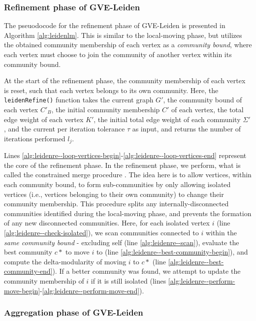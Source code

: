 \subsubsection{Refinement phase of GVE-Leiden}

The pseuodocode for the refinement phase of GVE-Leiden is presented in Algorithm \ref{alg:leidenlm}. This is similar to the local-moving phase, but utilizes the obtained community membership of each vertex as a \textit{community bound}, where each vertex must choose to join the community of another vertex within its community bound. At the start of the refinement phase, the community membership of each vertex is reset, such that each vertex belongs to its own community. Here, the \texttt{leidenRefine()} function takes the current graph $G'$, the community bound of each vertex $C'_B$, the initial community membership $C'$ of each vertex, the total edge weight of each vertex $K'$, the initial total edge weight of each community $\Sigma'$, and the current per iteration tolerance $\tau$ as input, and returns the number of iterations performed $l_j$.

Lines \ref{alg:leidenre--loop-vertices-begin}-\ref{alg:leidenre--loop-vertices-end} represent the core of the refinement phase. In the refinement phase, we perform, what is called the constrained merge procedure \cite{com-traag19}. The idea here is to allow vertices, within each community bound, to form sub-communities by only allowing isolated vertices (i.e., vertices belonging to their own community) to change their community membership. This procedure splits any internally-disconnected communities identified during the local-moving phase, and prevents the formation of any new disconnected communities. Here, for each isolated vertex $i$ (line \ref{alg:leidenre--check-isolated}), we scan communities connected to $i$ within the \textit{same community bound} - excluding self (line \ref{alg:leidenre--scan}), evaluate the best community $c*$ to move $i$ to (line \ref{alg:leidenre--best-community-begin}), and compute the delta-modularity of moving $i$ to $c*$ (line \ref{alg:leidenre--best-community-end}). If a better community was found, we attempt to update the community membership of $i$ if it is still isolated (lines \ref{alg:leidenre--perform-move-begin}-\ref{alg:leidenre--perform-move-end}).




\subsubsection{Aggregation phase of GVE-Leiden}

